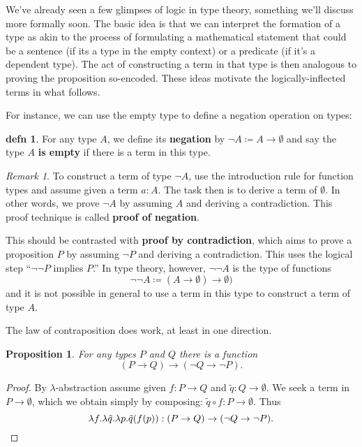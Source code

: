 \documentclass{amsart}
\theoremstyle{theorem}
\newtheorem*{prop}{Proposition}
\theoremstyle{definition}
\newtheorem*{defn}{defn}
\theoremstyle{remark}
\newtheorem*{rmk}{Remark}
\newcommand{\0}{\mathbbe{0}}
\newcommand{\1}{\mathbbe{1}}
\newcommand{\2}{\mathbbe{2}}
\newcommand{\3}{\mathbbe{3}}
\newcommand{\4}{\mathbbe{4}}
\begin{document}
We've already seen a few glimpses of logic in type theory, something we'll discuss more formally soon. The basic idea is that we can interpret the formation of a type as akin to the process of formulating a mathematical statement that could be a sentence (if its a type in the empty context) or a predicate (if it's a dependent type). The act of constructing a term in that type is then analogous to proving the proposition so-encoded. 
These ideas motivate the logically-inflected terms in what follows. 

For instance, we can use the empty type to define a negation operation on types:
\begin{defn}
For any type $A$, we define its \textbf{negation} by $\neg A \coloneq A \to \emptyset$ and say the type $A$ \textbf{is empty} if there is a term in this type.
\end{defn}

\begin{rmk} To construct a term of type $\neg A$, use the introduction rule for function types and assume given a term $a : A$. The task then is to derive a term of $\emptyset$. In other words, we prove $\neg A$ by assuming $A$ and deriving a contradiction. This proof technique is called \textbf{proof of negation}.

This should be contrasted with \textbf{proof by contradiction}, which aims to prove a proposition $P$ by assuming $\neg P$ and deriving a contradiction. This uses the logical step ``$\neg \neg P$ implies $P$.'' In type theory, however, $\neg \neg A$ is the type of functions
\[ \neg \neg A \coloneq (A \to \emptyset) \to \emptyset)\] and it is not possible in general to use a term in this type to construct a term of type $A$. 
\end{rmk}

The law of contraposition does work, at least in one direction.

\begin{prop} For any types $P$ and $Q$ there is a function
\[ (P \to Q) \to (\neg Q \to \neg P).\]
\end{prop}
\begin{proof}
By $\lambda$-abstraction assume given $f : P \to Q$ and $\tilde{q} : Q \to \emptyset$. We seek a term in $P \to \emptyset$, which we obtain simply by composing: $\tilde{q} \circ f : P \to \emptyset$. Thus
\[\lambda f. \lambda \tilde{q} .\lambda p. \tilde{q}(f(p)) : (P \to Q) \to (\neg Q \to \neg P). \qedhere\]
\end{proof}
\end{document}
